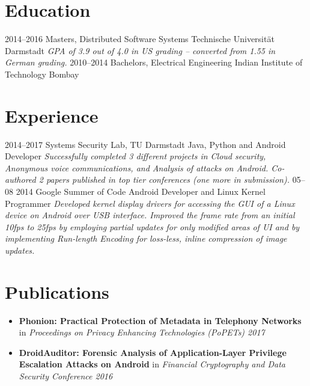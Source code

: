 \documentclass[]{friggeri-cv}
\begin{document}
\section{Education}
    \begin{entrylist}
        \entry
            {2014–2016}
            {Masters, {\normalfont Distributed Software Systems}}
            {Technische Universität Darmstadt}
            {\emph{GPA of 3.9 out of 4.0 in US grading -- converted from 1.55 in German grading.}}
        \entry
            {2010–2014}
            {Bachelors, {\normalfont Electrical Engineering}}
            {Indian Institute of Technology Bombay}
            {}%
    \end{entrylist}

\section{Experience}
    \begin{entrylist}
        \entry
            {2014–2017}
            {Systems Security Lab, TU Darmstadt}
            {Java, Python and Android Developer}
            {\emph{Successfully completed 3 different projects in Cloud security, Anonymous voice communications, and Analysis of attacks on Android. Co-authored 2 papers published in top tier conferences (one more in submission).}}
        \entry
            {05–08 2014}
            {Google Summer of Code}
            {Android Developer and Linux Kernel Programmer}
            {\emph{Developed kernel display drivers for accessing the GUI of a Linux device on Android over USB interface. Improved the frame rate from an initial 10fps to 25fps by employing partial updates for only modified areas of UI and by implementing Run-length Encoding for loss-less, inline compression of image updates.}}
    \end{entrylist}

\section{Publications}
    \begin{itemize}
        \item \textbf{Phonion: Practical Protection of Metadata in Telephony Networks} in \textit{Proceedings on Privacy Enhancing Technologies (PoPETs) 2017}
        \item \textbf{DroidAuditor: Forensic Analysis of Application-Layer Privilege Escalation Attacks on Android} in \textit{Financial Cryptography and Data Security Conference 2016}
    \end{itemize}
\end{document}
